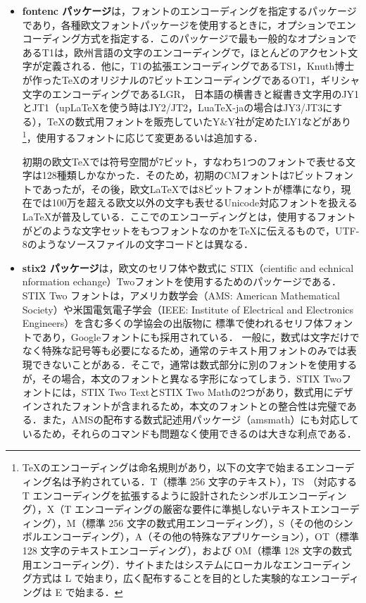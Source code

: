 \begin{itemize}
\item{\sffamily\bfseries fontenc パッケージ}は，フォントのエンコーディングを指定するパッケージであり\cite{fontenc}，各種欧文フォントパッケージを使用するときに，オプションでエンコーディング方式を指定する．このパッケージで最も一般的なオプションであるT1は，欧州言語の文字のエンコーディングで，ほとんどのアクセント文字が定義される．他に，T1の拡張エンコーディングであるTS1，Knuth博士が作った{\TeX}のオリジナルの7ビットエンコーディングであるOT1，ギリシャ文字のエンコーディングであるLGR，
日本語の横書きと縦書き文字用のJY1とJT1（up\LaTeX を使う時はJY2/JT2，Lua\TeX-jaの場合はJY3/JT3にする），{\TeX}の数式用フォントを販売していたY\&Y社が定めたLY1などがあり\footnote{
{\TeX}のエンコーディングは命名規則があり，以下の文字で始まるエンコーディング名は予約されている．T（標準 256 文字のテキスト），TS （対応する T エンコーディングを拡張するように設計されたシンボルエンコーディング），X（T エンコーディングの厳密な要件に準拠しないテキストエンコーディング），M（標準 256 文字の数式用エンコーディング），S（その他のシンボルエンコーディング），A（その他の特殊なアプリケーション），OT（標準 128 文字のテキストエンコーディング），および OM（標準 128 文字の数式用エンコーディング）．サイトまたはシステムにローカルなエンコーディング方式は L で始まり，広く配布することを目的とした実験的なエンコーディングは E で始まる．}，使用するフォントに応じて変更あるいは追加する．
\begin{screen}
\small\sffamily
初期の欧文{\TeX}では符号空間が7ビット，すなわち1つのフォントで表せる文字は128種類しかなかった．そのため，初期のCMフォントは7ビットフォントであったが，その後，欧文{\LaTeX}では8ビットフォントが標準になり，現在では100万を超える欧文以外の文字も表せるUnicode対応フォントを扱える{\LaTeX}が普及している．ここでのエンコーディングとは，使用するフォントがどのような文字セットをもつフォントなのかを{\TeX}に伝えるもので，UTF-8のようなソースファイルの文字コードとは異なる．
\end{screen}

\item{\sffamily\bfseries stix2 パッケージ}は，欧文のセリフ体や数式に STIX（cientific and echnical nformation echange）Twoフォントを使用するためのパッケージである\cite{stix2}．
STIX Two フォントは，アメリカ数学会（AMS: American Mathematical Society）や米国電気電子学会（IEEE: Institute of Electrical and Electronics Engineers）を含む多くの学協会の出版物に
標準で使われるセリフ体フォントであり，Googleフォントにも採用されている．
一般に，数式は文字だけでなく特殊な記号等も必要になるため，通常のテキスト用フォントのみでは表現できないことがある．そこで，通常は数式部分に別のフォントを使用するが，その場合，本文のフォントと異なる字形になってしまう．STIX Twoフォントには，STIX Two TextとSTIX Two Mathの2つがあり，数式用にデザインされたフォントが含まれるため，本文のフォントとの整合性は完璧である．また，AMSの配布する数式記述用パッケージ（amsmath）にも対応しているため，それらのコマンドも問題なく使用できるのは大きな利点である．


\end{itemize}
